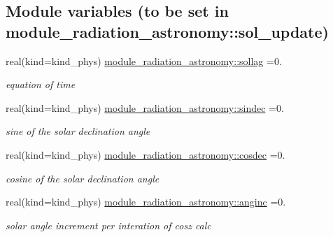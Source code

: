 \subsection*{Module variables (to be set in module\+\_\+radiation\+\_\+astronomy\+:\+:sol\+\_\+update)}
\begin{DoxyCompactItemize}
\item 
\mbox{\label{group__module__radiation__astronomy_ga264a011aa71fb670339ac555dc24e486}} 
real(kind=kind\+\_\+phys) \hyperlink{group__module__radiation__astronomy_ga264a011aa71fb670339ac555dc24e486}{module\+\_\+radiation\+\_\+astronomy\+::sollag} =0.
\begin{DoxyCompactList}\small\item\em equation of time \end{DoxyCompactList}\item 
\mbox{\label{group__module__radiation__astronomy_gae195d9c834e2789170f89c988d28b01e}} 
real(kind=kind\+\_\+phys) \hyperlink{group__module__radiation__astronomy_gae195d9c834e2789170f89c988d28b01e}{module\+\_\+radiation\+\_\+astronomy\+::sindec} =0.
\begin{DoxyCompactList}\small\item\em sine of the solar declination angle \end{DoxyCompactList}\item 
\mbox{\label{group__module__radiation__astronomy_ga07386e90045639b8023abd826e0e2768}} 
real(kind=kind\+\_\+phys) \hyperlink{group__module__radiation__astronomy_ga07386e90045639b8023abd826e0e2768}{module\+\_\+radiation\+\_\+astronomy\+::cosdec} =0.
\begin{DoxyCompactList}\small\item\em cosine of the solar declination angle \end{DoxyCompactList}\item 
\mbox{\label{group__module__radiation__astronomy_ga723159a44491e4ae974128123a1e8dcd}} 
real(kind=kind\+\_\+phys) \hyperlink{group__module__radiation__astronomy_ga723159a44491e4ae974128123a1e8dcd}{module\+\_\+radiation\+\_\+astronomy\+::anginc} =0.
\begin{DoxyCompactList}\small\item\em solar angle increment per interation of cosz calc \end{DoxyCompactList}\item 

\end{DoxyCompactItemize}
